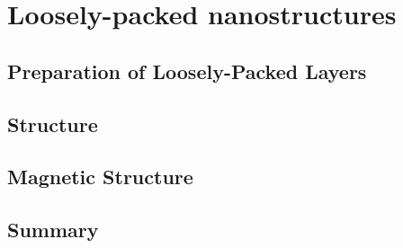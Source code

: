 \documentclass[\main/dresen_thesis.tex]{subfiles}
\renewcommand{\thisPath}{\main/chapters/looselyPackedNS}
\begin{document}
  \chapter{Loosely-packed nanostructures}\label{ch:looselyPackedNS}

    

    \section{Preparation of Loosely-Packed Layers}
      

    \section{Structure}
      

    \section{Magnetic Structure}

    \section{Summary}
      
\end{document}
